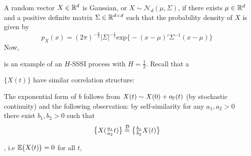 
A random vector $X\in \mathbb{R}^d$ is Gaussian, or $X\sim \mathcal{N}_d(\mu,\Sigma)$, if
there exists $\mu\in \mathbb{R}^d$ and a positive definite matrix $\Sigma\in \mathbb{R}^{d\times d}$
such that the probability density of $X$ is given by
\[ p_X(x) = (2\pi)^{-\frac{n}{2}}|\Sigma|^{-\frac{1}{2}}\text{exp}\bigl\{ - (x-\mu)'\Sigma^{-1}(x-\mu) \bigr\} \]
Now, 

 is an example of an $H$-SSSI
process with $H = \tfrac{1}{2}$. Recall that a 


$\bigl\{X(t)\bigr\}$ have similar
correlation structure:



The exponential form of $b$
follows from $X(t) \sim X(0)+o_{\mathbb{P}}(t)$ (by stochastic continuity) and the following observation: by self-similarity
for any $a_1, a_2>0$ there exist $b_1,b_2>0$ such that
\[ \bigl\{X(\tfrac{a_1}{a_2}t)\bigr\} \overset{\mathcal{D}}{=} \bigl\{\tfrac{b_1}{b_2} X(t)\bigr\} \]

, i.e $\mathbb{E}\bigl(X(t)\bigr) = 0$ for all $t$,


